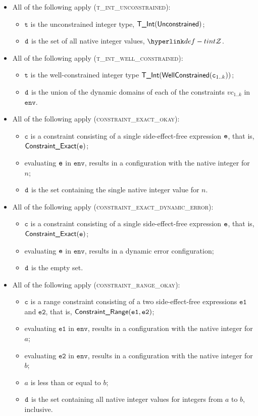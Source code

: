 \documentclass{book}
\newcommand\env[0]{\texttt{env}}
\newcommand\vc[0]{\texttt{c}}
\newcommand\vt[0]{\texttt{t}}
\newcommand\veone[0]{\texttt{e1}}
\newcommand\vetwo[0]{\texttt{e2}}
\begin{document}
\begin{itemize}
  \item All of the following apply (\textsc{t\_int\_unconstrained}):
  \begin{itemize}
    \item $\vt$ is the unconstrained integer type, $\textsf{T\_Int}(\textsf{Unconstrained})$;
    \item $\texttt{d}$ is the set of all native integer values, $\tint$.
  \end{itemize}

  \item All of the following apply (\textsc{t\_int\_well\_constrained}):
  \begin{itemize}
    \item $\vt$ is the well-constrained integer type $\TInt(\wellconstrained(\vc_{1..k}))$;
    \item $\texttt{d}$ is the union of the dynamic domains of each of the constraints $vc_{1..k}$ in $\env$.
  \end{itemize}

  \item All of the following apply (\textsc{constraint\_exact\_okay}):
  \begin{itemize}
    \item $\vc$ is a constraint consisting of a single side-effect-free expression $\texttt{e}$, that is, $\textsf{Constraint\_Exact}(\texttt{e})$;
    \item evaluating $\texttt{e}$ in $\env$, results in a configuration with the native integer for $n$;
    \item $\texttt{d}$ is the set containing the single native integer value for $n$.
  \end{itemize}

  \item All of the following apply (\textsc{constraint\_exact\_dynamic\_error}):
  \begin{itemize}
    \item $\vc$ is a constraint consisting of a single side-effect-free expression $\texttt{e}$, that is, $\textsf{Constraint\_Exact}(\texttt{e})$;
    \item evaluating $\texttt{e}$ in $\env$, results in a dynamic error configuration;
    \item $\texttt{d}$ is the empty set.
  \end{itemize}

  \item All of the following apply (\textsc{constraint\_range\_okay}):
  \begin{itemize}
    \item $\vc$ is a range constraint consisting of a two side-effect-free expressions $\veone$ and $\vetwo$, that is, $\ConstraintRange(\veone, \vetwo)$;
    \item evaluating $\veone$ in $\env$, results in a configuration with the native integer for $a$;
    \item evaluating $\vetwo$ in $\env$, results in a configuration with the native integer for $b$;
    \item $a$ is less than or equal to $b$;
    \item $\texttt{d}$ is the set containing all native integer values for integers from $a$ to $b$, inclusive.
  \end{itemize}


\end{itemize}
\end{document}
